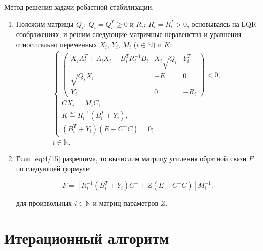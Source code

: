\begin{alg}
\label{alg:4/3}
Метод решения задачи робастной стабилизации.

\begin{enumerate}
\item Положим матрицы $Q_i\colon~Q_i = Q_i^T \geqslant 0$ и $R_i\colon~R_i = R_i^T > 0$, основываясь на LQR-соображениях, и решим следующие матричные неравенства и уравнения относительно переменных $X_i$, $Y_i$, $M_i$ ($i \in \mathbb{N}$) и $K$:
\begin{eqnarray}
\label{eq:4/15}
\left\{ \begin{array}{l}
         \left( \begin{array}{ccc}
                 X_iA_i^T + A_iX_i - B_i^TR_i^{-1}B_i  &  X_i\sqrt{Q_i}  &  Y_i^T \\
                 \sqrt{Q_i}X_i   &   -E   &   0 \\
                 Y_i   &   0   &   -R_i
                \end{array}
         \right) < 0\mbox{,} \\
         CX_i = M_iC\mbox{,} \\
         K \eqdef R_i^{-1}(B_i^T + Y_i)\mbox{,} \\
         (B_i^T + Y_i)(E - C^+C) = 0\mbox{;}
        \end{array} \right. \\
i \in \mathbb{N}\mbox{.} \nonumber
\end{eqnarray}

\item Если \vref{eq:4/15} разрешима, то вычислим матрицу усиления обратной связи $F$ по следующей формуле:

\begin{equation}
\label{eq:4/16}
F = [R_i^{-1}(B_i^T + Y_i)C^+ + Z(E + C^+C)]M_i^{-1}\mbox{.}
\end{equation}

для произвольных $i \in \mathbb{N}$ и матриц параметров $Z$.

\end{enumerate}

\end{alg}





\pagebreak
\section{Итерационный алгоритм}

